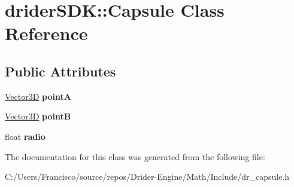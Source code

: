 \hypertarget{classdrider_s_d_k_1_1_capsule}{}\section{drider\+S\+DK\+:\+:Capsule Class Reference}
\label{classdrider_s_d_k_1_1_capsule}
\subsection*{Public Attributes}
\begin{DoxyCompactItemize}
\item 
\mbox{\label{classdrider_s_d_k_1_1_capsule_ace6d0e6c5710041739e7700c36b47252}} 
\hyperlink{classdrider_s_d_k_1_1_vector3_d}{Vector3D} {\bfseries pointA}
\item 
\mbox{\label{classdrider_s_d_k_1_1_capsule_ab803c439dbf76b119206737c18ca9ebe}} 
\hyperlink{classdrider_s_d_k_1_1_vector3_d}{Vector3D} {\bfseries pointB}
\item 
\mbox{\label{classdrider_s_d_k_1_1_capsule_a7c669246aed67d96f518f92f633a0883}} 
float {\bfseries radio}
\end{DoxyCompactItemize}


The documentation for this class was generated from the following file\+:\begin{DoxyCompactItemize}
\item 
C\+:/\+Users/\+Francisco/source/repos/\+Drider-\/\+Engine/\+Math/\+Include/dr\+\_\+capsule.\+h\end{DoxyCompactItemize}
